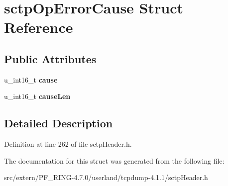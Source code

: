 \hypertarget{structsctp_op_error_cause}{
\section{sctpOpErrorCause Struct Reference}
\label{structsctp_op_error_cause}
}
\subsection*{Public Attributes}
\begin{DoxyCompactItemize}
\item 
\hypertarget{structsctp_op_error_cause_a2e7b256341296d89e0a992ad15b5c3a4}{
u\_\-int16\_\-t {\bfseries cause}}
\label{structsctp_op_error_cause_a2e7b256341296d89e0a992ad15b5c3a4}

\item 
\hypertarget{structsctp_op_error_cause_ade791066ff46aa792e70f3b6a490c3f9}{
u\_\-int16\_\-t {\bfseries causeLen}}
\label{structsctp_op_error_cause_ade791066ff46aa792e70f3b6a490c3f9}

\end{DoxyCompactItemize}


\subsection{Detailed Description}


Definition at line 262 of file sctpHeader.h.



The documentation for this struct was generated from the following file:\begin{DoxyCompactItemize}
\item 
src/extern/PF\_\-RING-\/4.7.0/userland/tcpdump-\/4.1.1/sctpHeader.h\end{DoxyCompactItemize}
